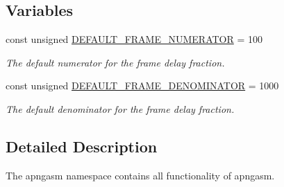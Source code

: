 \subsection*{Variables}
\begin{DoxyCompactItemize}
\item 
\hypertarget{namespaceapngasm_a5b334b6957e14291ff8f76cab562f60f}{const unsigned \hyperlink{namespaceapngasm_a5b334b6957e14291ff8f76cab562f60f}{D\-E\-F\-A\-U\-L\-T\-\_\-\-F\-R\-A\-M\-E\-\_\-\-N\-U\-M\-E\-R\-A\-T\-O\-R} = 100}\label{namespaceapngasm_a5b334b6957e14291ff8f76cab562f60f}

\begin{DoxyCompactList}\small\item\em The default numerator for the frame delay fraction. \end{DoxyCompactList}\item 
\hypertarget{namespaceapngasm_a867b3acbcc2624faf6b3e82732110594}{const unsigned \hyperlink{namespaceapngasm_a867b3acbcc2624faf6b3e82732110594}{D\-E\-F\-A\-U\-L\-T\-\_\-\-F\-R\-A\-M\-E\-\_\-\-D\-E\-N\-O\-M\-I\-N\-A\-T\-O\-R} = 1000}\label{namespaceapngasm_a867b3acbcc2624faf6b3e82732110594}

\begin{DoxyCompactList}\small\item\em The default denominator for the frame delay fraction. \end{DoxyCompactList}\end{DoxyCompactItemize}


\subsection{Detailed Description}
The apngasm namespace contains all functionality of apngasm. 